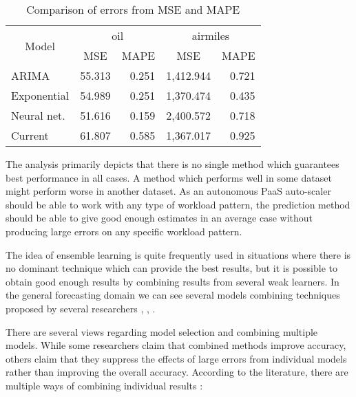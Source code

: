 \begin{table}[]
\centering
\caption{Comparison of errors from MSE and MAPE}
\label{my-label}
\begin{tabular}{|l|r|r|r|r|}
\hline
\multicolumn{1}{|c|}{\multirow{2}{*}{Model}} & \multicolumn{2}{c|}{oil}                             & \multicolumn{2}{c|}{airmiles}                        \\ \cline{2-5} 
\multicolumn{1}{|c|}{}                       & \multicolumn{1}{c|}{MSE} & \multicolumn{1}{c|}{MAPE} & \multicolumn{1}{c|}{MSE} & \multicolumn{1}{c|}{MAPE} \\ \hline
ARIMA                                        & 55.313                 & 0.251                   & 1,412.944              & 0.721                   \\ \hline
Exponential                                  & 54.989                 & 0.251                   & 1,370.474              & 0.435                   \\ \hline
Neural net.                                  & 51.616                 & 0.159                   & 2,400.572              & 0.718                   \\ \hline
Current                                      & 61.807                 & 0.585                   & 1,367.017              & 0.925                   \\ \hline
\end{tabular}
\end{table}

The analysis primarily depicts that there is no single method which guarantees best performance in all cases. A method which performs well in some dataset might perform worse in another dataset. As an autonomous PaaS auto-scaler should be able to work with any type of workload pattern, the prediction method should be able to give good enough estimates in an average case without producing large errors on any specific workload pattern.

The idea of ensemble learning is quite frequently used in situations where there is no dominant technique which can provide the best results, but it is possible to obtain good enough results by combining results from several weak learners. In the general forecasting domain we can see several models combining techniques proposed by several researchers \cite{Wagner_2011}, \cite{Zhang_2003}, \cite{Zou_2004}.

There are several views regarding model selection and combining multiple models. While some researchers claim that combined methods improve accuracy, others claim that they suppress the effects of large errors from individual models rather than improving the overall accuracy. According to the literature, there are multiple ways of combining individual results \cite{Adhikari_2012}:

